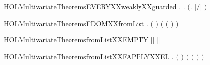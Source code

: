 \newcommand{\HOLMultivariateTheoremsdisjointXXimpXXweaklyXXguarded}{\UseVerbatim{HOLMultivariateTheoremsdisjointXXimpXXweaklyXXguarded}}
\begin{SaveVerbatim}{HOLMultivariateTheoremsEVERYXXweaklyXXguarded}
\HOLTokenTurnstile{} \HOLSymConst{\HOLTokenForall{}} .
          \HOLSymConst{\HOLTokenImp{}}
       \HOLSymConst{\HOLTokenForall{}} .    \HOLSymConst{\HOLTokenConj{}}    \HOLSymConst{\HOLTokenImp{}}  \ensuremath{(}\HOLTokenLambda{}. \ensuremath{[}\ensuremath{/}\ensuremath{]} \ensuremath{)}
\end{SaveVerbatim}
\newcommand{\HOLMultivariateTheoremsEVERYXXweaklyXXguarded}{\UseVerbatim{HOLMultivariateTheoremsEVERYXXweaklyXXguarded}}
\begin{SaveVerbatim}{HOLMultivariateTheoremsFDOMXXfromList}
\HOLTokenTurnstile{} \HOLSymConst{\HOLTokenForall{}} .
       \ensuremath{(}  \HOLSymConst{\ensuremath{=}}  \ensuremath{)} \HOLSymConst{\HOLTokenImp{}}
       \ensuremath{(} \ensuremath{(}  \ensuremath{)} \HOLSymConst{\ensuremath{=}}  \ensuremath{)}
\end{SaveVerbatim}
\newcommand{\HOLMultivariateTheoremsFDOMXXfromList}{\UseVerbatim{HOLMultivariateTheoremsFDOMXXfromList}}
\begin{SaveVerbatim}{HOLMultivariateTheoremsfromListXXEMPTY}
\HOLTokenTurnstile{}  \ensuremath{[}\ensuremath{]} \ensuremath{[}\ensuremath{]} \HOLSymConst{\ensuremath{=}} 
\end{SaveVerbatim}
\newcommand{\HOLMultivariateTheoremsfromListXXEMPTY}{\UseVerbatim{HOLMultivariateTheoremsfromListXXEMPTY}}
\begin{SaveVerbatim}{HOLMultivariateTheoremsfromListXXFAPPLYXXEL}
\HOLTokenTurnstile{} \HOLSymConst{\HOLTokenForall{}}  .
         \HOLSymConst{\HOLTokenConj{}} \ensuremath{(}  \HOLSymConst{\ensuremath{=}}  \ensuremath{)} \HOLSymConst{\HOLTokenConj{}}  \HOLSymConst{\HOLTokenLt{}}   \HOLSymConst{\HOLTokenImp{}}
       \ensuremath{(}    \ensuremath{(}  \ensuremath{)} \HOLSymConst{\ensuremath{=}}   \ensuremath{)}
\end{SaveVerbatim}
